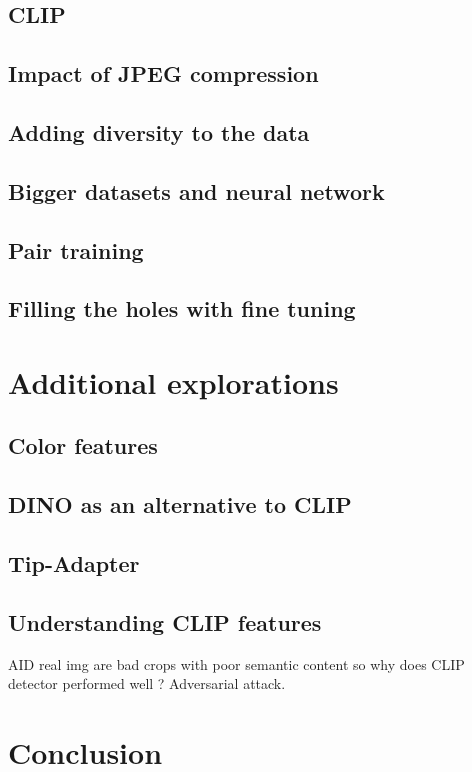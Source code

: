 \documentclass[12pt,a4paper]{article}
\begin{document}
\subsection{CLIP}
\autocite*{cozzolinoRaisingBarAIgenerated2024}
\subsection{Impact of JPEG compression}
\subsection{Adding diversity to the data}
\subsection{Bigger datasets and neural network}
\subsection{Pair training}
\subsection{Filling the holes with fine tuning}

\section{Additional explorations}
\subsection{Color features}

\subsection{DINO as an alternative to CLIP}
\autocite*{oquabDINOv2LearningRobust2024}

\subsection{Tip-Adapter}
\autocite*{khanCLIPpingDeceptionAdapting2024}
\autocite*{zhangTipAdapterTrainingfreeAdaption2022}
\subsection{Understanding CLIP features}
AID real img are bad crops with poor semantic content so why does CLIP detector performed well ?
Adversarial attack.

\section*{Conclusion}

\newpage
\printbibliography
\end{document}

